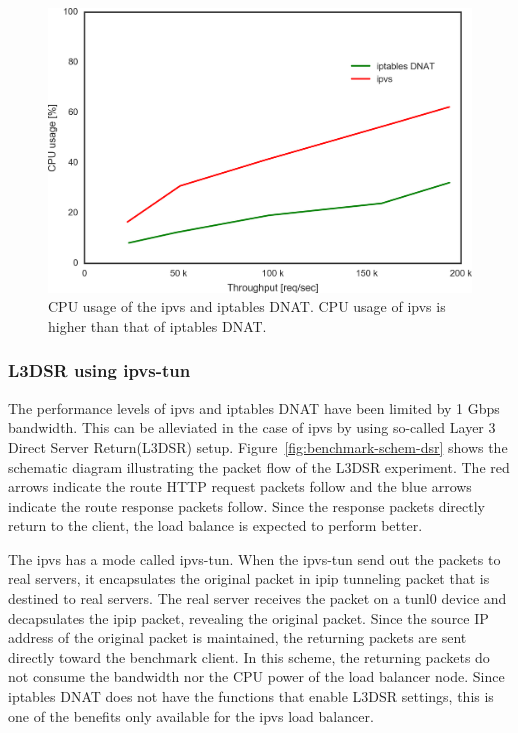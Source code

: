 \begin{figure}[h]
  \centering
  \includegraphics[width=0.75\columnwidth]{Figs/cpu_usage}
  \par\bigskip
  \centering
  \begin{minipage}{0.9\columnwidth}
    \caption[CPU usage of the ipvs and iptables DNAT]{
      CPU usage of the ipvs and iptables DNAT.
      CPU usage of ipvs is higher than that of iptables DNAT.
    }
    \label{fig:cpu_usage}
  \end{minipage}
\end{figure}

\FloatBarrier

\subsubsection{L3DSR using ipvs-tun}

The performance levels of ipvs and iptables DNAT have been limited by 1 Gbps bandwidth.
This can be alleviated in the case of ipvs by using so-called Layer 3 Direct Server Return(L3DSR) setup.
Figure~\ref{fig:benchmark-schem-dsr} shows the schematic diagram illustrating the packet flow of the L3DSR experiment.
The red arrows indicate the route HTTP request packets follow and the blue arrows indicate the route response packets follow.
Since the response packets directly return to the client, the load balance is expected to perform better.

The ipvs has a mode called ipvs-tun.
When the ipvs-tun send out the packets to real servers, it encapsulates the original packet in ipip tunneling packet that is destined to real servers.
The real server receives the packet on a tunl0 device and decapsulates the ipip packet, revealing the original packet.
Since the source IP address of the original packet is maintained, the returning packets are sent directly toward the benchmark client.
In this scheme, the returning packets do not consume the bandwidth nor the CPU power of the load balancer node.
Since iptables DNAT does not have the functions that enable L3DSR settings, this is one of the benefits only available for the ipvs load balancer.

